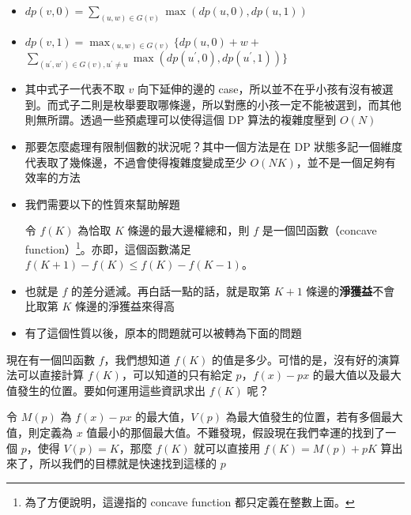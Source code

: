 \documentclass[standalone]{beamer}
\begin{document}
\begin{frame}{}
  \begin{itemize}
    \item $dp(v, 0) = \sum_{(u, w) \in G(v)}\max(dp(u, 0), dp(u, 1))$

    \item $dp(v, 1) = \max_{(u, w) \in G(v)} \{dp(u, 0) + w +$ $ 
      \sum_{(u^\prime, w^\prime) \in G(v), u^\prime \neq u}\max(dp(u^\prime, 0), dp(u^\prime, 1)) \}$

    \item 其中式子一代表不取 $v$ 向下延伸的邊的 case，所以並不在乎小孩有沒有被選到。而式子二則是枚舉要取哪條邊，所以對應的小孩一定不能被選到，而其他則無所謂。透過一些預處理可以使得這個 DP 算法的複雜度壓到 $O(N)$
    \item 那要怎麼處理有限制個數的狀況呢？其中一個方法是在 DP 狀態多記一個維度代表取了幾條邊，不過會使得複雜度變成至少 $O(NK)$，並不是一個足夠有效率的方法
  \end{itemize}
\end{frame}

\begin{frame}{}
  \begin{itemize}
    \item 我們需要以下的性質來幫助解題
    \begin{theorem}[性質]
      令 $f(K)$ 為恰取 $K$ 條邊的最大邊權總和，則 $f$ 是一個凹函數（concave function）\footnote{為了方便說明，這邊指的 concave function 都只定義在整數上面。}。亦即，這個函數滿足 $f(K + 1) - f(K) \leq f(K) - f(K - 1)$。
    \end{theorem}
    \item 也就是 $f$ 的差分遞減。再白話一點的話，就是取第 $K + 1$ 條邊的\textbf{淨獲益}不會比取第 $K$ 條邊的淨獲益來得高
    \item 有了這個性質以後，原本的問題就可以被轉為下面的問題
  \end{itemize}
\end{frame}

\begin{frame}{}
  \begin{problem}[等價的問題]
    現在有一個凹函數 $f$，我們想知道 $f(K)$ 的值是多少。可惜的是，沒有好的演算法可以直接計算 $f(K)$，可以知道的只有給定 $p$，$f(x) - px$ 的最大值以及最大值發生的位置。要如何運用這些資訊求出 $f(K)$ 呢？
  \end{problem}

  令 $M(p)$ 為 $f(x) - px$ 的最大值，$V(p)$ 為最大值發生的位置，若有多個最大值，則定義為 $x$ 值最小的那個最大值。不難發現，假設現在我們幸運的找到了一個 $p$，使得 $V(p) = K$，那麼 $f(K)$ 就可以直接用 $f(K) = M(p) + pK$ 算出來了，所以我們的目標就是快速找到這樣的 $p$
\end{frame}
\end{document}
